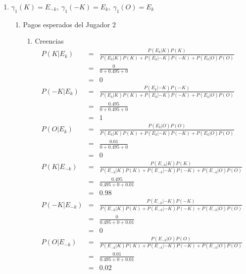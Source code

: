 {\begin{enumerate}
    \item $\gamma_1(K)=E_{-k}, \ \gamma_1(-K)=E_k, \ \gamma_1(O)=E_{k}$ %
    \begin{enumerate}
    \item Pagos esperados del Jugador 2
    \begin{enumerate}
        \item Creencias
            \begin{eqnarray*}
                P(K|E_k)&=&\frac{P(E_k|K)P(K)}{P(E_k|K)P(K)+P(E_k|-K)P(-K)+P(E_k|O)P(O)}\\
                        &=&\frac{0}{0+0.495+0}\\
                        &=&0\\
                P(-K|E_k)&=&\frac{P(E_k|-K)P(-K)}{P(E_k|K)P(K)+P(E_k|-K)P(-K)+P(E_k|O)P(O)}\\
                        &=&\frac{0.495}{0+0.495+0}\\
                        &=&1\\
                P(O|E_k)&=&\frac{P(E_k|O)P(O)}{P(E_k|K)P(K)+P(E_k|-K)P(-K)+P(E_k|O)P(O)}\\
                        &=&\frac{0.01}{0+0.495+0}\\
                        &=&0\\
                P(K|E_{-k})&=&\frac{P(E_{-k}|K)P(K)}{P(E_{-k}|K)P(K)+P(E_{-k}|-K)P(-K)+P(E_{-k}|O)P(O)}\\
                        &=&\frac{0.495}{0.495+0+0.01}\\
                        &=&0.98\\
                P(-K|E_{-k})&=&\frac{P(E_{-k}|-K)P(-K)}{P(E_{-k}|K)P(K)+P(E_{-k}|-K)P(-K)+P(E_{-k}|O)P(O)}\\
                        &=&\frac{0}{0.495+0+0.01}\\
                        &=&0\\
                P(O|E_{-k})&=&\frac{P(E_{-k}|O)P(O)}{P(E_{-k}|K)P(K)+P(E_{-k}|-K)P(-K)+P(E_{-k}|O)P(O)}\\
                        &=&\frac{0.01}{0.495+0+0.01}\\
                        &=&0.02
            \end{eqnarray*}
            

\end{enumerate}
\end{enumerate}
\end{enumerate}}
